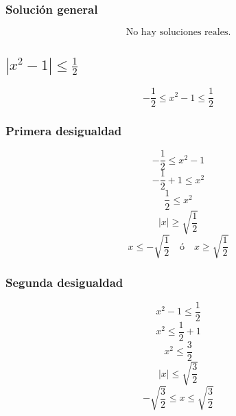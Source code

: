\subsubsection*{Soluci\'on general}

\begin{equation*}
    \text{No hay soluciones reales.}
\end{equation*}




\subsection*{$|x^2-1|\leq \frac{1}{2}$}

\[-\frac{1}{2} \leq x^2 - 1 \leq \frac{1}{2}\]

\subsubsection*{Primera desigualdad}
\[-\frac{1}{2} \leq x^2 - 1\]
\[-\frac{1}{2} + 1 \leq x^2\]
\[\frac{1}{2} \leq x^2\]
\[|x| \geq \sqrt{\frac{1}{2}}\]
\[x \leq -\sqrt{\frac{1}{2}} \quad \text{ó} \quad x \geq \sqrt{\frac{1}{2}}\]

\subsubsection*{Segunda desigualdad}

\[x^2 - 1 \leq \frac{1}{2}\]
\[x^2 \leq \frac{1}{2} + 1\]
\[x^2 \leq \frac{3}{2}\]
\[|x| \leq \sqrt{\frac{3}{2}}\]
\[-\sqrt{\frac{3}{2}} \leq x \leq \sqrt{\frac{3}{2}}\]

